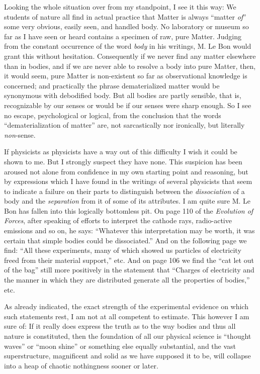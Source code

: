 \documentclass[a4paper, 11pt, oneside, polutonikogreek, english]{article}
\begin{document}
Looking the whole situation over from my standpoint, I see it this way: We students of nature all find in actual practice that Matter is always ``matter \emph{of}'' some very obvious, easily seen, and handled body. No laboratory or museum so far as I have seen or heard contains a specimen of raw, pure Matter. Judging from the constant occurrence of the word \emph{body} in his writings, M. Le Bon would grant this without hesitation. Consequently if we never find any matter elsewhere than in bodies, and if we are never able to resolve a body into pure Matter, then, it would seem, pure Matter is non-existent so far as observational knowledge is concerned; and practically the phrase dematerialized matter would be synonymous with debodified body. But all bodies are partly sensible, that is, recognizable by our senses or would be if our senses were sharp enough. So I see no escape, psychological or logical, from the conclusion that the words ``dematerialization of matter'' are, not sarcastically nor ironically, but literally \emph{non}-sense.

If physicists as physicists have a way out of this difficulty I wish it could be shown to me. But I strongly suspect they have none. This suspicion has been aroused not alone from confidence in my own starting point and reasoning, but by expressions which I have found in the writings of several physicists that seem to indicate a failure on their parts to distinguish between the \emph{dissociation} of a body and the \emph{separation} from it of some of its attributes. I am quite sure M. Le Bon has fallen into this logically bottomless pit. On page 110 of the \emph{Evolution of Forces}, after speaking of efforts to interpret the cathode rays, radio-active emissions and so on, he says: ``Whatever this interpretation may be worth, it was certain that simple bodies could be dissociated.'' And on the following page we find: ``All these experiments, many of which showed us particles of electricity freed from their material support,'' etc. And on page 106 we find the ``cat let out of the bag'' still more positively in the statement that ``Charges of electricity and the manner in which they are distributed generate all the properties of bodies,'' etc.

As already indicated, the exact strength of the experimental evidence on which such statements rest, I am not at all competent to estimate. This however I am sure of: If it really does express the truth as to the way bodies and thus all nature is constituted, then the foundation of all our physical science is ``thought waves'' or ``moon shine'' or something else equally substantial, and the vast superstructure, magnificent and solid as we have supposed it to be, will collapse into a heap of chaotic nothingness sooner or later.
\end{document}
